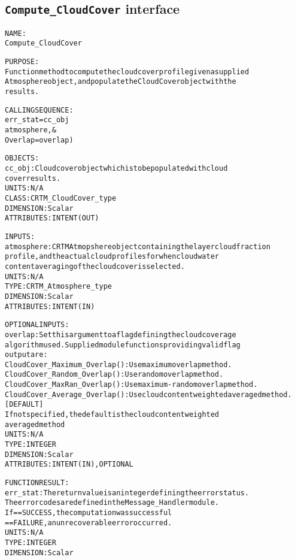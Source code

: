\subsection{\texttt{Compute\_CloudCover} interface}
  \label{sec:Compute_CloudCover_interface}
  \begin{alltt}
 
  NAME:
    Compute_CloudCover
 
  PURPOSE:
    Function method to compute the cloud cover profile given a supplied
    Atmosphere object, and populate the CloudCover object with the
    results.
 
  CALLING SEQUENCE:
    err_stat = cc_obj%Compute_CloudCover( &
                 atmosphere       , &
                 Overlap = overlap  )
 
  OBJECTS:
    cc_obj:      Cloud cover object which is to be populated with cloud
                 cover results.
                 UNITS:      N/A
                 CLASS:      CRTM_CloudCover_type
                 DIMENSION:  Scalar
                 ATTRIBUTES: INTENT(OUT)
 
  INPUTS:
    atmosphere:  CRTM Atmopshere object containing the layer cloud fraction
                 profile, and the actual cloud profiles for when cloud water
                 content averaging of the cloud cover is selected.
                 UNITS:      N/A
                 TYPE:       CRTM_Atmosphere_type
                 DIMENSION:  Scalar
                 ATTRIBUTES: INTENT(IN)
 
  OPTIONAL INPUTS:
    overlap:     Set this argument to a flag defining the cloud coverage
                 algorithm used. Supplied module functions providing valid flag
                 output are:
                   CloudCover_Maximum_Overlap(): Use maximum overlap method.
                   CloudCover_Random_Overlap() : Use random overlap method.
                   CloudCover_MaxRan_Overlap() : Use maximum-random overlap method.
                   CloudCover_Average_Overlap(): Use cloud content weighted averaged method. [DEFAULT]
                 If not specified, the default is the cloud content weighted
                 averaged method
                 UNITS:      N/A
                 TYPE:       INTEGER
                 DIMENSION:  Scalar
                 ATTRIBUTES: INTENT(IN), OPTIONAL
 
  FUNCTION RESULT:
    err_stat:    The return value is an integer defining the error status.
                 The error codes are defined in the Message_Handler module.
                   If == SUCCESS, the computation was successful
                      == FAILURE, an unrecoverable error occurred.
                 UNITS:      N/A
                 TYPE:       INTEGER
                 DIMENSION:  Scalar
 
  \end{alltt}
